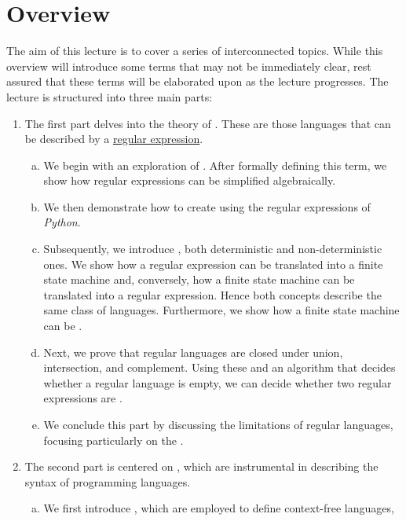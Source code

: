 \section{Overview}
The aim of this lecture is to cover a series of interconnected topics.
While this overview will introduce some terms that may not be immediately clear, rest assured that these terms will
be elaborated upon as the lecture progresses.
The lecture is structured into three main parts:
\begin{enumerate}
\item The first part delves into the theory of .  These are those languages that can be
described by a \href{https://en.wikipedia.org/wiki/regular_expression}{regular expression}.
\begin{enumerate}[(a)]
\item We begin with an exploration of . After formally defining this term, we
      show how regular expressions can be simplified algebraically.
\item We then demonstrate how to create  using the regular expressions of \textsl{Python}.
\item Subsequently, we introduce , both deterministic and non-deterministic ones.
      We show how a regular expression can be translated into a finite state machine and, conversely, how a
      finite state machine can be translated into a regular expression.  Hence both concepts describe the
      same class of languages.  Furthermore, we show how a finite state machine can be .
\item Next, we prove that regular languages are closed under union, intersection, and complement.  Using these
       and an algorithm that decides whether a regular language is empty, we can
      decide whether two regular expressions are .
\item We conclude this part by discussing the limitations of regular languages, focusing particularly on the
      .
\end{enumerate}
\item The second part is centered on , which are instrumental in describing the syntax of programming languages.
\begin{enumerate}[(a)]
\item We first introduce , which are employed to define context-free languages,

\end{enumerate}
\end{enumerate}
